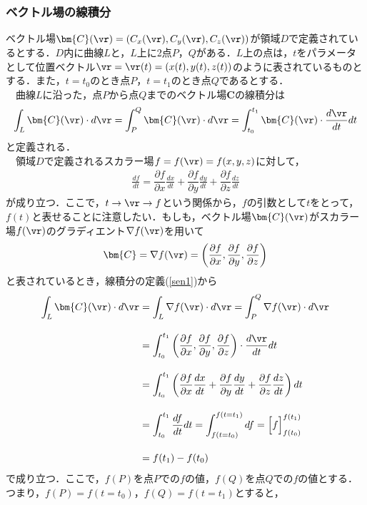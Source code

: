 \subsubsection{ベクトル場の線積分}
ベクトル場$\bm{C}(\vr)=(C_x(\vr),C_y(\vr),C_z(\vr))$が領域$D$で定義されているとする．$D$内に曲線$L$と，$L$上に2点$P$，$Q$がある．$L$上の点は，$t$をパラメータとして位置ベクトル$\vr=\vr(t)=(x(t),y(t),z(t))$のように表されているものとする．また，$t=t_0$のとき点$P$，$t=t_1$のとき点$Q$であるとする．\\
　曲線$L$に沿った，点$P$から点$Q$までのベクトル場$\bm{C}$の線積分は
\begin{align}\label{sen1}
\int_L\bm{C}(\vr)\cdot d\vr=\int_P^Q\bm{C}(\vr)\cdot d\vr=\int_{t_0}^{t_1}\bm{C}(\vr)\cdot \frac{d\vr}{dt}dt
\end{align}
と定義される．\\
　領域$D$で定義されるスカラー場$f=f(\vr)=f(x,y,z)$に対して，
\begin{align}\label{chain}
\frac{df}{dt}=\dfrac{\partial f}{\partial x}\frac{dx}{dt}
+\dfrac{\partial f}{\partial y}\frac{dy}{dt}
+\dfrac{\partial f}{\partial z}\frac{dz}{dt}
\end{align}
が成り立つ．ここで，$t\to\vr\to f$という関係から，$f$の引数として$t$をとって，$f(t)$と表せることに注意したい．もしも，ベクトル場$\bm{C}(\vr)$がスカラー場$f(\vr)$のグラディエント$\nabla f(\vr)$を用いて
\begin{align}\label{nab}
\bm{C}=\nabla f(\vr)
=\left(
\dfrac{\partial f}{\partial x},
\dfrac{\partial f}{\partial y},
\dfrac{\partial f}{\partial z}
\right)
\end{align}
と表されているとき，線積分の定義(\ref{sen1})から
\begin{align}\label{sen2}
\int_L\bm{C}(\vr)\cdot d\vr&=\int_L\nabla f(\vr)\cdot d\vr=\int_P^Q\nabla f(\vr)\cdot d\vr\notag\\[10pt]
&=\int_{t_0}^{t_1}\left(
\dfrac{\partial f}{\partial x},
\dfrac{\partial f}{\partial y},
\dfrac{\partial f}{\partial z}
\right)\cdot \frac{d\vr}{dt}dt\notag\\[10pt]
%
%
&=\int_{t_0}^{t_1}\left(\dfrac{\partial f}{\partial x}\frac{dx}{dt}
+\dfrac{\partial f}{\partial y}\frac{dy}{dt}
+\dfrac{\partial f}{\partial z}\frac{dz}{dt}\right)dt\notag\\[10pt]
%
&=\int_{t_0}^{t_1}\frac{df}{dt}dt=\int_{f(t=t_0)}^{f(t=t_1)}df=\Bigl[f\Bigr]_{f(t_0)}^{f(t_1)}\notag\\[10pt]
&=f(t_1)-f(t_0)
\end{align}
で成り立つ．ここで，$f(P)$を点$P$での$f$の値，$f(Q)$を点$Q$での$f$の値とする．つまり，$f(P)=f(t=t_0)$，$f(Q)=f(t=t_1)$とすると，
